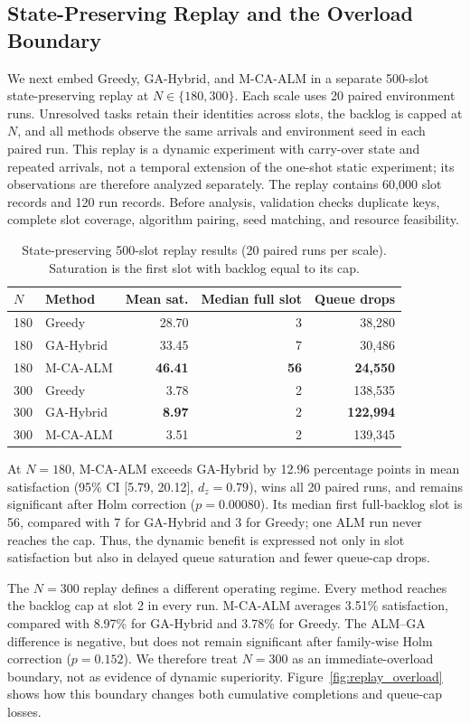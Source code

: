 \subsection{State-Preserving Replay and the Overload Boundary}
We next embed Greedy, GA-Hybrid, and M-CA-ALM in a separate 500-slot state-preserving replay at $N\in\{180,300\}$. Each scale uses 20 paired environment runs. Unresolved tasks retain their identities across slots, the backlog is capped at $N$, and all methods observe the same arrivals and environment seed in each paired run. This replay is a dynamic experiment with carry-over state and repeated arrivals, not a temporal extension of the one-shot static experiment; its observations are therefore analyzed separately. The replay contains 60,000 slot records and 120 run records. Before analysis, validation checks duplicate keys, complete slot coverage, algorithm pairing, seed matching, and resource feasibility.

\begin{table}[t]
\centering
\caption{State-preserving 500-slot replay results (20 paired runs per scale). Saturation is the first slot with backlog equal to its cap.}
\label{tab:official_replay}
\scriptsize
\begin{tabular}{llrrr}
\toprule
$N$ & Method & Mean sat. & Median full slot & Queue drops \\
\midrule
180 & Greedy & 28.70 & 3 & 38,280 \\
180 & GA-Hybrid & 33.45 & 7 & 30,486 \\
180 & M-CA-ALM & \textbf{46.41} & \textbf{56} & \textbf{24,550} \\
300 & Greedy & 3.78 & 2 & 138,535 \\
300 & GA-Hybrid & \textbf{8.97} & 2 & \textbf{122,994} \\
300 & M-CA-ALM & 3.51 & 2 & 139,345 \\
\bottomrule
\end{tabular}
\end{table}

At $N=180$, M-CA-ALM exceeds GA-Hybrid by 12.96 percentage points in mean satisfaction (95\% CI [5.79, 20.12], $d_z=0.79$), wins all 20 paired runs, and remains significant after Holm correction ($p=0.00080$). Its median first full-backlog slot is 56, compared with 7 for GA-Hybrid and 3 for Greedy; one ALM run never reaches the cap. Thus, the dynamic benefit is expressed not only in slot satisfaction but also in delayed queue saturation and fewer queue-cap drops.

The $N=300$ replay defines a different operating regime. Every method reaches the backlog cap at slot 2 in every run. M-CA-ALM averages 3.51\% satisfaction, compared with 8.97\% for GA-Hybrid and 3.78\% for Greedy. The ALM--GA difference is negative, but does not remain significant after family-wise Holm correction ($p=0.152$). We therefore treat $N=300$ as an immediate-overload boundary, not as evidence of dynamic superiority. Figure~\ref{fig:replay_overload} shows how this boundary changes both cumulative completions and queue-cap losses.

